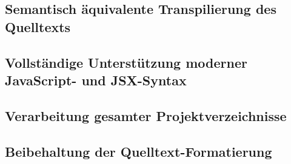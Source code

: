   \subsection{Semantisch äquivalente Transpilierung des Quelltexts}
  \label{subsection:requirement:semantic-equivalence}

  \subsection{Vollständige Unterstützung moderner JavaScript- und JSX-Syntax}
  \label{subsection:requirement:modern-js-support}

  \subsection{Verarbeitung gesamter Projektverzeichnisse}
  \label{subsection:requirement:batch-processing}

  \subsection{Beibehaltung der Quelltext-Formatierung}
  \label{subsection:requirement:format}
